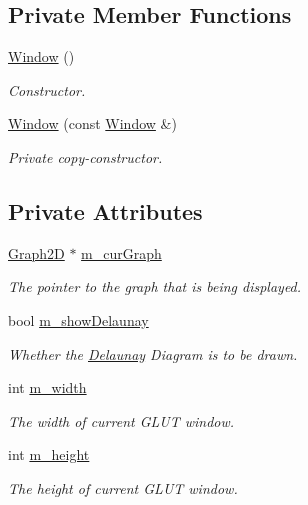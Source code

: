 \subsection*{Private Member Functions}
\begin{DoxyCompactItemize}
\item 
\hyperlink{classcmst_1_1_window_a2f0377f780b0dec7f9ca43145d98e8d1}{Window} ()
\begin{DoxyCompactList}\small\item\em Constructor. \end{DoxyCompactList}\item 
\hyperlink{classcmst_1_1_window_a3a06a150faa316137c794be5acac4979}{Window} (const \hyperlink{classcmst_1_1_window}{Window} \&)
\begin{DoxyCompactList}\small\item\em Private copy-\/constructor. \end{DoxyCompactList}\end{DoxyCompactItemize}
\subsection*{Private Attributes}
\begin{DoxyCompactItemize}
\item 
\hyperlink{classcmst_1_1_graph2_d}{Graph2D} $\ast$ \hyperlink{classcmst_1_1_window_a86d6a605ac3dc593de030802009e73bc}{m\_curGraph}
\begin{DoxyCompactList}\small\item\em The pointer to the graph that is being displayed. \end{DoxyCompactList}\item 
bool \hyperlink{classcmst_1_1_window_a527a10c574abe1ad1e0279465b07a7f0}{m\_showDelaunay}
\begin{DoxyCompactList}\small\item\em Whether the \hyperlink{class_delaunay}{Delaunay} Diagram is to be drawn. \end{DoxyCompactList}\item 
int \hyperlink{classcmst_1_1_window_a2955f1032cf2ab577a5f01776e46f671}{m\_width}
\begin{DoxyCompactList}\small\item\em The width of current GLUT window. \end{DoxyCompactList}\item 
int \hyperlink{classcmst_1_1_window_a9447754382ddb8894d50a40d19f027a3}{m\_height}
\begin{DoxyCompactList}\small\item\em The height of current GLUT window. \end{DoxyCompactList}\end{DoxyCompactItemize}
